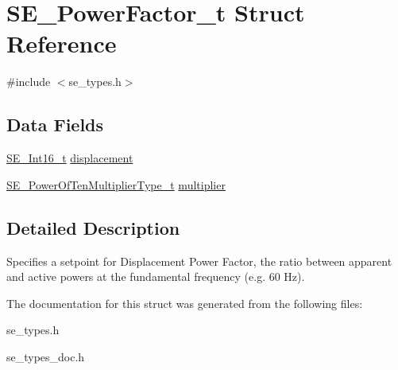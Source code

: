 \hypertarget{structSE__PowerFactor__t}{}\section{S\+E\+\_\+\+Power\+Factor\+\_\+t Struct Reference}
\label{structSE__PowerFactor__t}


{\ttfamily \#include $<$se\+\_\+types.\+h$>$}

\subsection*{Data Fields}
\begin{DoxyCompactItemize}
\item 
\hyperlink{group__Int16_ga0d600c7df811a7d4b4816e8965877690}{S\+E\+\_\+\+Int16\+\_\+t} \hyperlink{group__PowerFactor_gac0b338823886a77ad3c03fab42c9ac5a}{displacement}
\item 
\hyperlink{group__PowerOfTenMultiplierType_gaf0317b781dc8dbb9cb6ac4e44a14fdef}{S\+E\+\_\+\+Power\+Of\+Ten\+Multiplier\+Type\+\_\+t} \hyperlink{group__PowerFactor_ga7e8d88767803b7c7ed6f1c6f7eb5e08a}{multiplier}
\end{DoxyCompactItemize}


\subsection{Detailed Description}
Specifies a setpoint for Displacement Power Factor, the ratio between apparent and active powers at the fundamental frequency (e.\+g. 60 Hz). 

The documentation for this struct was generated from the following files\+:\begin{DoxyCompactItemize}
\item 
se\+\_\+types.\+h\item 
se\+\_\+types\+\_\+doc.\+h\end{DoxyCompactItemize}
